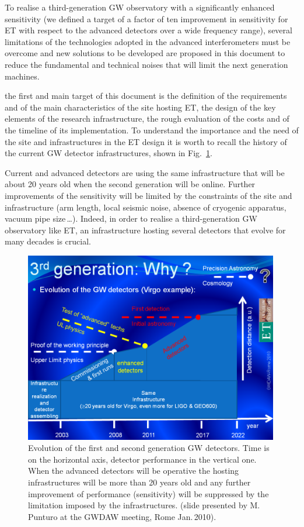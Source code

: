 To realise a third-generation GW observatory with a significantly enhanced sensitivity (we defined a target of a factor of ten improvement in sensitivity for ET with respect to the advanced detectors over a wide frequency range), several limitations of the technologies adopted in the advanced interferometers must be overcome and new solutions to be developed are proposed in this document to reduce the fundamental and technical noises that will limit the next generation machines. \par

the first and main target of this document is the definition of 
the requirements and of the main characteristics of the site hosting ET, 
the design of the key elements of the research infrastructure, the rough 
evaluation of the costs and of the timeline of its implementation.  To 
understand the importance and the need of the site and infrastructures 
in the ET design it is worth to recall the history of the current GW detector 
infrastructures, shown in Fig.~\ref{Fig:InfraEvolution}.

Current and advanced detectors are using the same infrastructure that 
will be about 20 years old when the second generation will be online. 
Further improvements of the sensitivity will be limited by the constraints 
of the site and infrastructure (arm length, local seismic noise, absence of 
cryogenic apparatus, vacuum pipe size\,\ldots). Indeed, in order to realise 
a third-generation GW observatory like ET, an infrastructure hosting 
several detectors that evolve for many decades is crucial.


\begin{figure}
\centering
\includegraphics[width=0.99\textwidth]{Intro/Intro_Figures/GWDAW-2010PunturoInfrastructureAdv.png}
\caption{Evolution of the first and second generation GW detectors. Time is on the horizontal axis, detector performance in the vertical one. When the advanced detectors will be operative the hosting infrastructures will be more than 20 years old and any further improvement of performance (sensitivity) will be suppressed by the limitation imposed by the infrastructures. (slide presented by M.\,Punturo at the GWDAW meeting, Rome Jan.\,2010).}
\label{Fig:InfraEvolution}
\end{figure}
